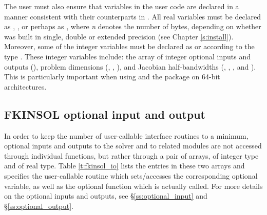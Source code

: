 The user must also ensure that variables in the user {\F} code are
declared in a manner consistent with their counterparts in {\kinsol}.
All real variables must be declared as , ,
or perhaps as , where {\em n} denotes the number of bytes,
depending on whether {\kinsol} was built in single, double or extended precision 
(see Chapter \ref{s:install}). Moreover, some of the {\F} integer variables
must be declared as  or  according to the 
{\C} type . These integer variables include: the array
of integer optional inputs and outputs (), problem dimensions (,
, ), and Jacobian half-bandwidths (, ,
, and ). This is particularly important when using
{\kinsol} and the {\fkinsol} package on 64-bit architectures.



\subsection{FKINSOL optional input and output}
In order to keep the number of user-callable {\fkinsol} interface routines to
a minimum, optional inputs and outputs to the {\kinsol} solver and to related 
modules are not accessed through individual functions, but rather through a
pair of arrays,  of integer type and  of real type.
Table \ref{t:fkinsol_io} lists the entries in these two arrays and specifies the
{\fkinsol} user-callable routine which sets/accesses the corresponding optional
variable, as well as the {\kinsol} optional function which is actually called.
For more details on the optional inputs and outputs, see \S\ref{ss:optional_input}
and \S\ref{ss:optional_output}.

